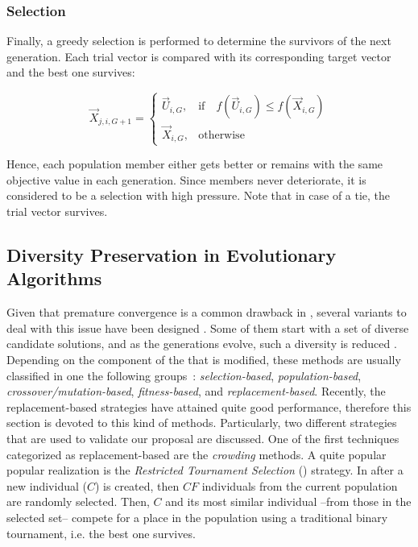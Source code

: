 \subsubsection{Selection}
Finally, a greedy selection is performed to determine the survivors of the next generation.
%
Each trial vector is compared with its corresponding target vector and the best one survives:

\begin{equation} \label{eqn:selection}
\vec{X}_{j,i,G+1}= 
\begin{cases}
    \vec{U}_{i,G},& \text{if} \quad f(\vec{U}_{i,G}) \leq f(\vec{X}_{i,G})  \\
    \vec{X}_{i,G},              & \text{otherwise}
\end{cases}
\end{equation}

Hence, each population member either gets better or remains with the same objective value in each generation.
%
Since members never deteriorate, it is considered to be a selection with high pressure.
%
Note that in case of a tie, the trial vector survives.

%



\subsection{Diversity Preservation in Evolutionary Algorithms}

Given that premature convergence is a common drawback in  \EAS{}, several variants to deal with this issue have been designed \cite{eshelman1993real}.
%
Some of them start with a set of diverse candidate solutions, and as the generations evolve, such a diversity is reduced \cite{Crepinsek:13}.
%
Depending on the component of the \EA{} that is modified, these methods are usually classified in one the following groups~\cite{Crepinsek:13}: \textit{selection-based}, \textit{population-based}, \textit{crossover/mutation-based}, \textit{fitness-based}, and \textit{replacement-based}.
%
Recently, the replacement-based strategies have attained quite good performance, therefore this section is devoted to this kind
of methods.
%
Particularly, two different strategies that are used to validate our proposal are discussed.
%
One of the first techniques categorized as replacement-based are the \textit{crowding} methods.
%
A quite popular popular realization is the \textit{Restricted Tournament Selection} \cite{harik1995finding} (\RTS{}) strategy.
%
In \RTS{} after a new individual ($C$) is created, then $CF$ individuals from the current population are randomly selected.
%
Then, $C$ and its most similar individual --from those in the selected set-- compete for a place in the population using a traditional binary tournament, i.e. the best one survives.
%

